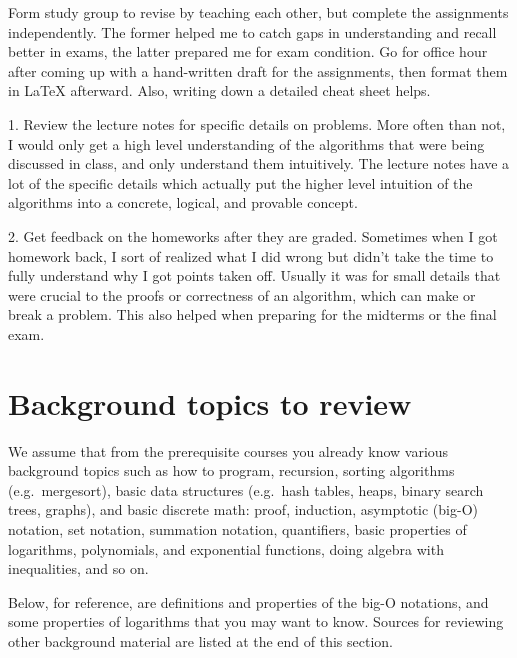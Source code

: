 \documentclass[11pt]{article}
\begin{document}
\noindent \hrulefill 

Form study group to revise by teaching each other, but complete the assignments independently. The former helped me to catch gaps in understanding and recall better in exams, the latter prepared me for exam condition. Go for office hour after coming up with a hand-written draft for the assignments, then format them in LaTeX afterward. Also, writing down a detailed cheat sheet helps.

\noindent \hrulefill 

1. Review the lecture notes for specific details on problems. More often than not, I would only get a high level understanding of the algorithms that were being discussed in class, and only understand them intuitively. The lecture notes have a lot of the specific details which actually put the higher level intuition of the algorithms into a concrete, logical, and provable concept.  
 
2. Get feedback on the homeworks after they are graded. Sometimes when I got homework back, I sort of realized what I did wrong but didn't take the time to fully understand why I got points taken off. Usually it was for small details that were crucial to the proofs or correctness of an algorithm, which can make or break a problem. This also helped when preparing for the midterms or the final exam.


\newpage %

\section{Background topics to review}\label{prelim: sec: background}

We assume that from the prerequisite courses you already know various background topics such as
how to program, recursion, sorting algorithms (e.g.~mergesort), basic data structures
(e.g.~hash tables, heaps, binary search trees, graphs),
and basic discrete math: proof, induction, asymptotic (big-O) notation, 
set notation, summation notation, quantifiers,
basic properties of logarithms, polynomials, and exponential functions,
doing algebra with inequalities, and so on.

Below, for reference, are definitions and properties of the big-O notations,
and some properties of logarithms that you may want to know.
Sources for reviewing other background material are listed at the end of this section. 
\end{document}
